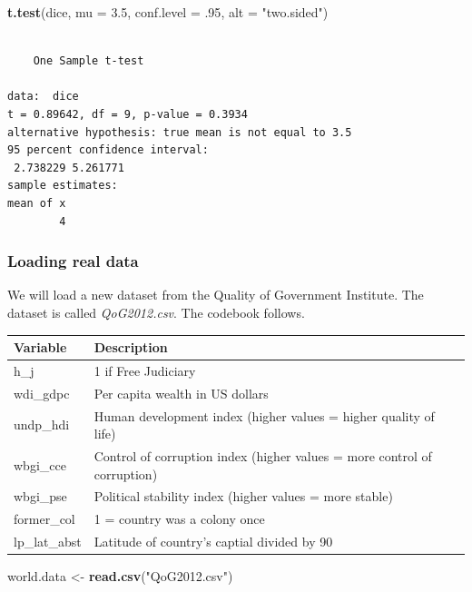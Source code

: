 \documentclass[]{article}
\newenvironment{Shaded}{\begin{snugshade}}{\end{snugshade}}
\newcommand{\DataTypeTok}[1]{\textcolor[rgb]{0.13,0.29,0.53}{#1}}
\newcommand{\FloatTok}[1]{\textcolor[rgb]{0.00,0.00,0.81}{#1}}
\newcommand{\KeywordTok}[1]{\textcolor[rgb]{0.13,0.29,0.53}{\textbf{#1}}}
\newcommand{\NormalTok}[1]{#1}
\newcommand{\StringTok}[1]{\textcolor[rgb]{0.31,0.60,0.02}{#1}}
\begin{document}
\begin{Shaded}
\begin{Highlighting}[]
\KeywordTok{t.test}\NormalTok{(dice, }\DataTypeTok{mu =} \FloatTok{3.5}\NormalTok{, }\DataTypeTok{conf.level =} \FloatTok{.95}\NormalTok{, }\DataTypeTok{alt =} \StringTok{"two.sided"}\NormalTok{)}
\end{Highlighting}
\end{Shaded}

\begin{verbatim}

    One Sample t-test

data:  dice
t = 0.89642, df = 9, p-value = 0.3934
alternative hypothesis: true mean is not equal to 3.5
95 percent confidence interval:
 2.738229 5.261771
sample estimates:
mean of x 
        4 
\end{verbatim}

\hypertarget{loading-real-data}{%
\subsubsection{Loading real data}\label{loading-real-data}}

We will load a new dataset from the Quality of Government Institute. The dataset is called \emph{QoG2012.csv}. The codebook follows.

\begin{tabular}{l|l}
\hline
Variable & Description\\
\hline
h\_j & 1 if Free Judiciary\\
\hline
wdi\_gdpc & Per capita wealth in US dollars\\
\hline
undp\_hdi & Human development index (higher values = higher quality of life)\\
\hline
wbgi\_cce & Control of corruption index (higher values = more control of corruption)\\
\hline
wbgi\_pse & Political stability index (higher values = more stable)\\
\hline
former\_col & 1 = country was a colony once\\
\hline
lp\_lat\_abst & Latitude of country's captial divided by 90\\
\hline
\end{tabular}

\begin{Shaded}
\begin{Highlighting}[]
\NormalTok{world.data <-}\StringTok{ }\KeywordTok{read.csv}\NormalTok{(}\StringTok{"QoG2012.csv"}\NormalTok{)}
\end{Highlighting}
\end{Shaded}
\end{document}
